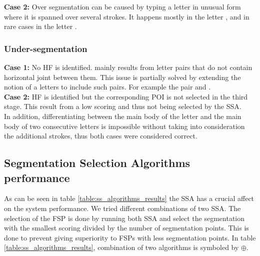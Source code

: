 \documentclass[10pt, conference, compsocconf]{IEEEtran}
\begin{document}
\textbf{Case 2:} Over segmentation can be caused by typing a letter in unusual form where it is spanned over several strokes. It happens mostly in the letter ,  and in rare cases in the letter .


\subsubsection{Under-segmentation}
\textbf{Case 1:} No HF is identified. mainly results from letter pairs that do not contain horizontal joint between them. This issue is partially solved by extending the notion of a letters to include such pairs. For example the pair  and .\\

\textbf{Case 2:} HF is identified but the corresponding POI is not selected in the third stage. This result from a low scoring and thus not being selected by the SSA.\\

In addition, differentiating between the main body of the letter  and the main body of two consecutive  letters is impossible without taking into consideration the additional strokes, thus both cases were considered correct.


\subsection{Segmentation Selection Algorithms performance}
\label{subsec:ssa_performance}
As can be seen in table \ref{table:ss_algorithms_results} the SSA has a crucial affect on the system performance. We tried different combinations of two SSA. The selection of the FSP is done by running both SSA and select the segmentation with the smallest scoring divided by the number of segmentation points. This is done to prevent giving superiority to FSPs with less segmentation points. In table \ref{table:ss_algorithms_results}, combination of two algorithms is symboled by $\oplus$.
\end{document}
